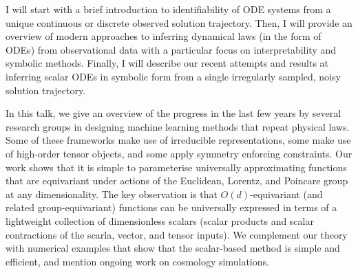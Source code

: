 \license

I will start with a brief introduction to identifiability of ODE systems from a unique continuous or discrete observed solution trajectory. Then, I will provide an overview of modern approaches to inferring dynamical laws (in the form of ODEs) from observational data with a particular focus on interpretability and symbolic methods. Finally, I will describe our recent attempts and results at inferring scalar ODEs in symbolic form from a single irregularly sampled, noisy solution trajectory.

\license

In this talk, we give an overview of the progress in the last few years by several research groups in designing machine learning methods that repeat physical laws. Some of these frameworks make use of irreducible representations, some make use of high-order tensor objects, and some apply symmetry enforcing constraints. Our work shows that it is simple to parameterise universally approximating functions that are equivariant under actions of the Euclidean, Lorentz, and Poincare group at any dimensionality. The key observation is that $O(d)$-equivariant (and related group-equivariant) functions can be universally expressed in terms of a lightweight collection of dimensionless scalars (scalar products and scalar contractions of the scarla, vector, and tensor inputs). We complement our theory with numerical examples that show that the scalar-based method is simple and efficient, and mention ongoing work on cosmology simulations.

\license

